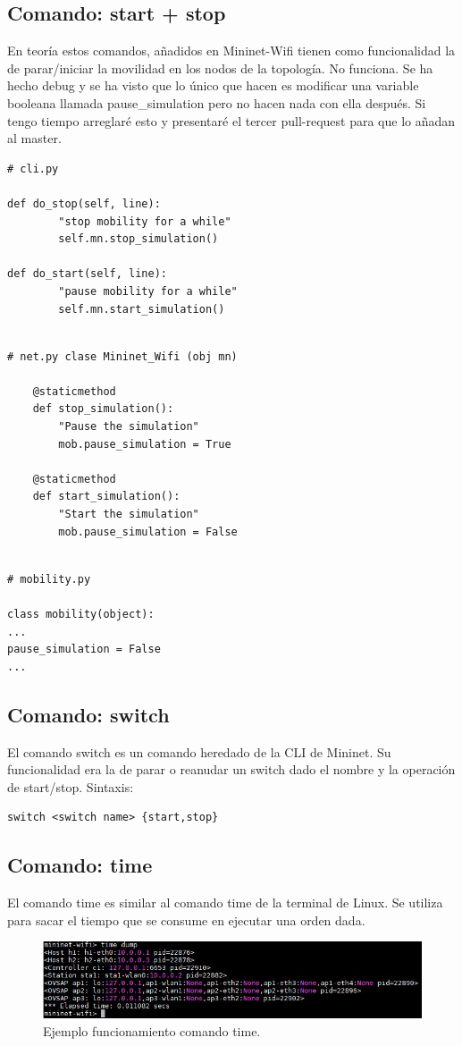\subsection{Comando: start + stop}
En teoría estos comandos, añadidos en Mininet-Wifi tienen como funcionalidad la de  parar/iniciar la movilidad en los nodos de la topología. No funciona. Se ha hecho debug y se ha visto que lo único que hacen es modificar una variable booleana llamada
pause\_simulation pero no hacen nada con ella después. Si tengo tiempo arreglaré esto y presentaré el tercer pull-request para que lo añadan al master.
\begin{verbatim}
# cli.py

def do_stop(self, line):
        "stop mobility for a while"
        self.mn.stop_simulation()

def do_start(self, line):
        "pause mobility for a while"
        self.mn.start_simulation()
        
\end{verbatim}
\newpage
\begin{verbatim}
# net.py clase Mininet_Wifi (obj mn)

    @staticmethod
    def stop_simulation():
        "Pause the simulation"
        mob.pause_simulation = True

    @staticmethod
    def start_simulation():
        "Start the simulation"
        mob.pause_simulation = False
        
\end{verbatim}
\begin{verbatim}
# mobility.py

class mobility(object):
...
pause_simulation = False
...
\end{verbatim}
\subsection{Comando: switch}
El comando switch es un comando heredado de la CLI de Mininet. Su funcionalidad era la de parar o reanudar un switch dado el nombre y la operación de start/stop. Sintaxis:\newline
\begin{verbatim}
switch <switch name> {start,stop}
\end{verbatim}
\subsection{Comando: time}
El comando time es similar al comando time de la terminal de Linux. Se utiliza para sacar el tiempo que se consume en ejecutar una orden dada.  
\begin{figure}[!htb]
  \centering
    \includegraphics[width=\linewidth]{./img/cli/12.JPG}
    \caption{Ejemplo funcionamiento comando time.}
  \label{fig:yo}
\end{figure}

